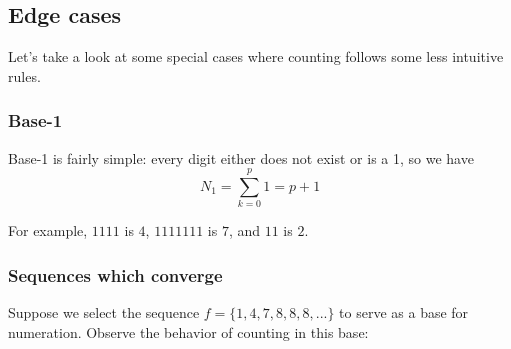 \documentclass{article}
\begin{document}
\subsection{Edge cases}

\noindent Let's take a look at some special cases where counting follows some less intuitive rules.

\subsubsection{Base-1}

\noindent Base-1 is fairly simple: every digit either does not exist or is a 1, so we have \begin{equation}N_1 = \sum_{k=0}^{p} 1 = p + 1\end{equation}

\noindent For example, $1111$ is $4$, $1111111$ is $7$, and $11$ is $2$. 

\subsubsection{Sequences which converge}

\noindent Suppose we select the sequence $f = \{1, 4, 7, 8, 8, 8, ...\}$ to serve as a base for numeration. Observe the behavior of counting in this base:
\end{document}
